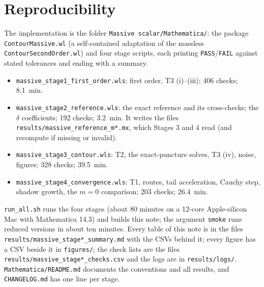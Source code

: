 \documentclass[11pt,a4paper]{article}
\newcommand{\code}[1]{\texttt{#1}}
\begin{document}
\section{Reproducibility}\label{sec:repro}
\begin{sloppypar}
The implementation is the folder \code{Massive scalar/Mathematica/}: the package \code{ContourMassive.wl} (a self-contained adaptation of the massless \code{ContourSecondOrder.wl}) and four stage scripts, each printing \code{PASS}/\code{FAIL} against stated tolerances and ending with a summary.
\begin{itemize}[leftmargin=*]
\item \code{massive\_stage1\_\allowbreak first\_\allowbreak order.wls}: first order, T3 (i)--(iii); 406 checks; 8.1~min.
\item \code{massive\_stage2\_\allowbreak reference.wls}: the exact reference and its cross-checks; the $\delta$ coefficients; 192 checks; 3.2~min. It writes the files \code{results/\allowbreak massive\_\allowbreak reference\_\allowbreak m*.mx}, which Stages 3 and 4 read (and recompute if missing or invalid).
\item \code{massive\_stage3\_\allowbreak contour.wls}: T2, the exact-puncture solves, T3 (iv), noise, figures; 328 checks; 39.5~min.
\item \code{massive\_stage4\_\allowbreak convergence.wls}: T1, routes, tail acceleration, Cauchy step, shadow growth, the $m=0$ comparison; 203 checks; 26.4~min.
\end{itemize}
\code{run\_all.sh} runs the four stages (about 80 minutes on a 12-core Apple-silicon Mac with Mathematica 14.3) and builds this note; the argument \code{smoke} runs reduced versions in about ten minutes.
Every table of this note is in the files \code{results/\allowbreak massive\_\allowbreak stage*\_\allowbreak summary.md} with the CSVs behind it; every figure has a CSV beside it in \code{figures/}; the check lists are the files \code{results/\allowbreak massive\_\allowbreak stage*\_\allowbreak checks.csv} and the logs are in \code{results/logs/}.
\code{Mathematica/README.md} documents the conventions and all results, and \code{CHANGELOG.md} has one line per stage.
\end{sloppypar}
\end{document}
